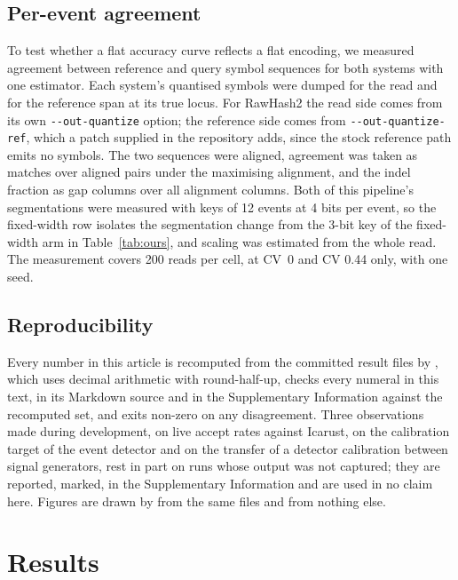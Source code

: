 \documentclass[11pt,a4paper]{article}
\begin{document}
\subsection{Per-event agreement}\label{sec:agreement}

To test whether a flat accuracy curve reflects a flat encoding, we measured agreement between
reference and query symbol sequences for both systems with one estimator. Each system's quantised
symbols were dumped for the read and for the reference span at its true locus. For RawHash2 the
read side comes from its own \texttt{-{}-out-quantize} option; the reference side comes from
\texttt{-{}-out-quantize-ref}, which a patch supplied in the repository adds, since the stock
reference path emits no symbols. The two sequences were aligned, agreement was taken as matches
over aligned pairs under the maximising alignment, and the indel fraction as gap columns over all
alignment columns. Both of this pipeline's segmentations were measured with keys of 12 events at 4
bits per event, so the fixed-width row isolates the segmentation change from the 3-bit key of the
fixed-width arm in Table~\ref{tab:ours}, and scaling was estimated from the whole read. The
measurement covers 200 reads per cell, at CV~0 and CV 0.44 only, with one seed.

\subsection{Reproducibility}\label{sec:repro}

Every number in this article is recomputed from the committed result files by
, which uses decimal arithmetic with
round-half-up, checks every numeral in this text, in its Markdown source and in the Supplementary
Information against the recomputed set, and exits non-zero on any disagreement. Three observations made during development, on live
accept rates against Icarust, on the calibration target of the event detector and on the transfer
of a detector calibration between signal generators, rest in part on runs whose output was not
captured; they are reported, marked, in the Supplementary Information and are used in no claim
here. Figures are drawn by
 from the same files and from nothing else.

\section{Results}\label{sec:results}
\end{document}
